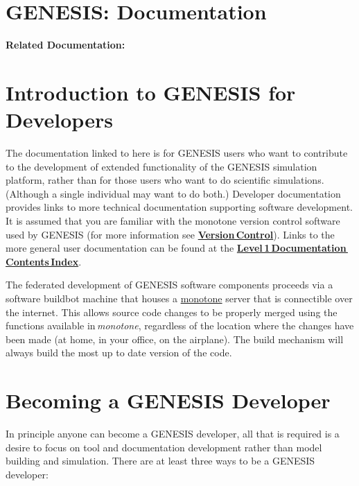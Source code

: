 \documentclass[12pt]{article}
\begin{document}
\section*{GENESIS: Documentation}

{\bf Related Documentation:}

\section*{Introduction to GENESIS for Developers}

The documentation linked to here is for GENESIS users who want to contribute to the development of extended functionality of the GENESIS simulation platform, rather than for those users who want to do scientific simulations. (Although a single individual may want to do both.) Developer documentation provides links to more technical documentation supporting software development. It is assumed that you are familiar with the monotone version control software used by GENESIS (for more information see \href{../version-control/version-control.tex}{\bf Version\,Control}). Links to the more general user documentation can be found at the \href{http://www.genesis-sim.org/userdocs/contents-level1/contents-level1.html}{\bf Level\,1\,Documentation\,Contents\,Index}. 

The federated development of GENESIS software components proceeds via a software buildbot machine that houses a \href{http://monotone.ca/}{monotone} server that is connectible over the internet. This allows source code changes to be properly merged using the functions available in\,{\it monotone}, regardless of the location where the changes have been made (at home, in your office, on the airplane). The build mechanism will always build the most up to date version of the code.

\section*{Becoming a GENESIS Developer}

In principle anyone can become a GENESIS developer, all that is required is a desire to focus on tool and documentation development rather than model building and simulation. There are at least three ways to be a GENESIS  developer:
\end{document}
